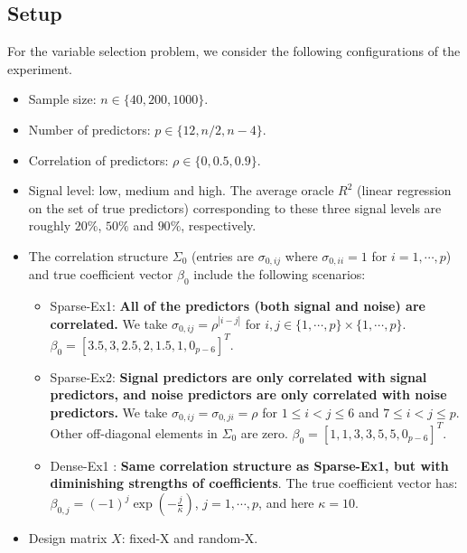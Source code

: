 \subsection{Setup}
\label{sec:simulation_setup_subset}
For the variable selection problem, we consider the following configurations of the experiment.
\begin{itemize}
	\item Sample size: $n \in \{40, 200, 1000\}$.
	\item Number of predictors: $p \in \{12, n/2, n-4\}$.
	\item Correlation of predictors: $\rho \in \{0,0.5,0.9\}$.
	\item Signal level: low, medium and high. The average oracle $R^2$ (linear regression on the set of true predictors) corresponding to these three signal levels are roughly $20\%$, $50\%$ and $90\%$, respectively.
	\item The correlation structure $\Sigma_0$ (entries are $\sigma_{0,ij}$ where $\sigma_{0,ii}=1$ for $i=1,\cdots,p$) and true coefficient vector $\beta_0$ include the following scenarios:
	\begin{itemize}
		\item Sparse-Ex1: \textbf{All of the predictors (both signal and noise) are correlated.} We take $\sigma_{0,ij}=\rho^{|i-j|}$ for $i,j\in\{1,\cdots,p\}\times\{1,\cdots,p\}$. $\beta_0=[3.5,3,2.5,2,1.5,1,0_{p-6}]^T$. 
		\item Sparse-Ex2: \textbf{Signal predictors are only correlated with signal predictors, and noise predictors are only correlated with noise predictors.} We take $\sigma_{0,ij}=\sigma_{0,ji}=\rho$ for $1\le i <j \le 6$ and $7\le i <j \le p$. Other off-diagonal elements in $\Sigma_0$ are zero. $\beta_0=[1,1,3,3,5,5,0_{p-6}]^T$.
		\item Dense-Ex1 \citep{Taddy2017}: \textbf{Same correlation structure as Sparse-Ex1, but with diminishing strengths of coefficients}. The true coefficient vector has: $\beta_{0,j} = \displaystyle (-1)^j \exp(-\frac{j}{\kappa})$, $j=1,\cdots,p$, and here $\kappa=10$.
	\end{itemize}
  \item Design matrix $X$: fixed-X and random-X.
\end{itemize}

